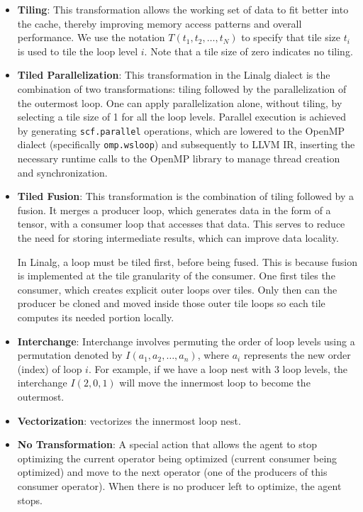 \documentclass[10pt,twocolumn]{article}
\begin{document}
\begin{itemize}
\item \textbf{Tiling}: This transformation allows the working set of data to fit better into the cache, thereby improving memory access patterns and overall performance. We use the notation $T(t_1, t_2, \ldots, t_N)$ to specify that tile size $t_i$ is used to tile the loop level $i$. Note that a tile size of zero indicates no tiling.
\item \textbf{Tiled Parallelization}: This transformation in the Linalg dialect is the combination of two transformations: tiling followed by the parallelization of the outermost loop. One can apply parallelization alone, without tiling, by selecting a tile size of 1 for all the loop levels. Parallel execution is achieved by generating \texttt{scf.parallel} operations, which are lowered to the OpenMP dialect (specifically \texttt{omp.wsloop}) and subsequently to LLVM IR, inserting the necessary runtime calls to the OpenMP library to manage thread creation and synchronization.
\item \textbf{Tiled Fusion}: This transformation is the combination of tiling followed by a fusion. It merges a producer loop, which generates data in the form of a tensor, with a consumer loop that accesses that data. This serves to reduce the need for storing intermediate results, which can improve data locality.

In Linalg, a loop must be tiled first, before being fused. This is because fusion is implemented at the tile granularity of the consumer. One first tiles the consumer, which creates explicit outer loops over tiles. Only then can the producer be cloned and moved inside those outer tile loops so each tile computes its needed portion locally.
\item \textbf{Interchange}: Interchange involves permuting the order of loop levels using a permutation denoted by $I(a_1, a_2, \ldots, a_n)$, where $a_i$ represents the new order (index) of loop $i$. For example, if we have a loop nest with 3 loop levels, the interchange $I(2, 0, 1)$ will move the innermost loop to become the outermost.
\item \textbf{Vectorization}: vectorizes the innermost loop nest.
\item \textbf{No Transformation}: A special action that allows the agent to stop optimizing the current operator being optimized (current consumer being optimized) and move to the next operator (one of the producers of this consumer operator). When there is no producer left to optimize, the agent stops.
\end{itemize}
\end{document}

